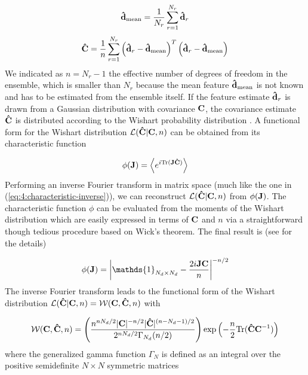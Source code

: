 \begin{equation}
\label{eq:5:meanest-sim}
\mathbf{\hat{d}}_{\rm mean} = \frac{1}{N_r}\sum_{r=1}^{N_r}\mathbf{\hat{d}}_r 
\end{equation}
%
\begin{equation}
\label{eq:5:covestest-sim}
\mathbf{\hat{C}} = \frac{1}{n}\sum_{r=1}^{N_r}\left(\mathbf{\hat{d}}_r-\mathbf{\hat{d}}_{\rm mean}\right)^T\left(\mathbf{\hat{d}}_r-\mathbf{\hat{d}}_{\rm mean}\right) 
\end{equation}
%
We indicated as $n=N_r-1$ the effective number of degrees of freedom in the ensemble, which is smaller than $N_r$ because the mean feature $\mathbf{\hat{d}}_{\rm mean}$ is not known and has to be estimated from the ensemble itself. If the feature estimate $\mathbf{\hat{d}}_r$ is drawn from a Gaussian distribution with covariance $\mathbf{C}$, the covariance estimate $\mathbf{\hat{C}}$ is distributed according to the Wishart probability distribution \citep{Taylor12,Taylor14,MasumotoWishart}. A functional form for the Wishart distribution $\mathcal{L}(\mathbf{\hat{C}}\vert\mathbf{C},n)$ can be obtained from its characteristic function 

\begin{equation}
\label{eq:5:chardef}
\phi(\mathbf{J}) = \left\langle e^{i{\rm Tr}(\mathbf{J}\mathbf{\hat{C}})}\right\rangle
\end{equation}
%
Performing an inverse Fourier transform in matrix space (much like the one in (\ref{eq:4:characteristic-inverse})), we can reconstruct $\mathcal{L}(\mathbf{\hat{C}}\vert\mathbf{C},n)$ from $\phi(\mathbf{J})$. The characteristic function $\phi$ can be evaluated from the moments of the Wishart distribution which are easily expressed in terms of $\mathbf{C}$ and $n$ via a straightforward though tedious procedure based on Wick's theorem. The final result is (see \citep{Taylor12} for the details)

\begin{equation}
\label{eq:5:charw}
\phi(\bb{J}) = \left\vert\mathds{1}_{N_d\times N_d}-\frac{2i\bb{JC}}{n}\right\vert^{-n/2}
\end{equation}
%
The inverse Fourier transform leads to the functional form of the Wishart distribution $\mathcal{L}(\mathbf{\hat{C}}\vert\mathbf{C},n) = \mathcal{W}(\mathbf{C},\mathbf{\hat{C}},n)$ with

\begin{equation}
\label{eq:5:wishart}
\mathcal{W}(\mathbf{C},\mathbf{\hat{C}},n) =  \left(\frac{n^{nN_d/2}\vert \mathbf{C}\vert^{-n/2}\vert\mathbf{\hat{C}}\vert^{(n-N_d-1)/2}}{2^{nN_d/2}\Gamma_{N_d}(n/2)}\right)\exp\left(-\frac{n}{2}{\rm Tr}(\mathbf{\hat{C}}\mathbf{C}^{-1})\right)
\end{equation}
%
where the generalized gamma function $\Gamma_N$ is defined as an integral over the positive semidefinite $N\times N$ symmetric matrices 


